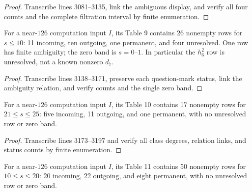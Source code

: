 \begin{proof}
  Transcribe lines 3081--3135, link the ambiguous display, and verify all four
  counts and the complete filtration interval by finite enumeration.
\end{proof}

\begin{proposition}
  \label{data:table-s126-low}
  \notready
  For a near-$126$ computation input $I$, its Table 9 contains 26 nonempty rows
  for $s\le10$: 11 incoming, ten outgoing, one permanent, and four unresolved.
  One row has finite ambiguity; the zero band is $s=0$--$1$.  In particular the
  $h_6^2$ row is unresolved, not a known nonzero $d_7$.
\end{proposition}

\begin{proof}
  Transcribe lines 3138--3171, preserve each question-mark status, link the
  ambiguity relation, and verify counts and the single zero band.
\end{proof}

\begin{proposition}
  \label{data:table-s127-high}
  \notready
  For a near-$126$ computation input $I$, its Table 10 contains 17 nonempty rows
  for $21\le s\le25$: five incoming, 11 outgoing, and one permanent, with no
  unresolved row or zero band.
\end{proposition}

\begin{proof}
  Transcribe lines 3173--3197 and verify all class degrees, relation links, and
  status counts by finite enumeration.
\end{proof}

\begin{proposition}
  \label{data:table-s127-middle}
  \notready
  For a near-$126$ computation input $I$, its Table 11 contains 50 nonempty rows
  for $10\le s\le20$: 20 incoming, 22 outgoing, and eight permanent, with no
  unresolved row or zero band.
\end{proposition}

